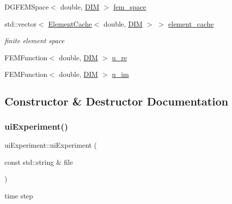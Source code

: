 \begin{DoxyCompactItemize}
\item 
D\+G\+F\+E\+M\+Space$<$ double, \mbox{\hyperlink{complex__node___t_h_f_e_m_2uiexp_8h_a589b8b9bfdf714f736059845d568b597}{D\+IM}} $>$ \mbox{\hyperlink{classui_experiment_a7532fa0202196a17b46ea8a3c9241410}{fem\+\_\+space}}
\item 
std\+::vector$<$ \mbox{\hyperlink{struct_element_cache}{Element\+Cache}}$<$ double, \mbox{\hyperlink{complex__node___t_h_f_e_m_2uiexp_8h_a589b8b9bfdf714f736059845d568b597}{D\+IM}} $>$ $>$ \mbox{\hyperlink{classui_experiment_a3386a72dec8a1d7065f553f42d1f181b}{element\+\_\+cache}}
\begin{DoxyCompactList}\small\item\em finite element space \end{DoxyCompactList}\item 
F\+E\+M\+Function$<$ double, \mbox{\hyperlink{complex__node___t_h_f_e_m_2uiexp_8h_a589b8b9bfdf714f736059845d568b597}{D\+IM}} $>$ \mbox{\hyperlink{classui_experiment_aac4bf7e51a978a58d1dab5f0dcb62b54}{u\+\_\+re}}
\item 
F\+E\+M\+Function$<$ double, \mbox{\hyperlink{complex__node___t_h_f_e_m_2uiexp_8h_a589b8b9bfdf714f736059845d568b597}{D\+IM}} $>$ \mbox{\hyperlink{classui_experiment_a52c236e8afbb37ae0baa97ada2305d93}{u\+\_\+im}}
\end{DoxyCompactItemize}


\subsection{Constructor \& Destructor Documentation}
\mbox{\label{classui_experiment_aaebdbaabc4e6ab6d83015dff92519d2c}} 
\subsubsection{\texorpdfstring{ui\+Experiment()}{uiExperiment()}\hspace{0.1cm}{\footnotesize\ttfamily [1/2]}}
{\footnotesize\ttfamily ui\+Experiment\+::ui\+Experiment (\begin{DoxyParamCaption}\item[{const std\+::string \&}]{file }\end{DoxyParamCaption})}



time step 

